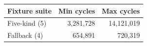 \begin{tabular}{lrr}
\toprule
Fixture suite & Min cycles & Max cycles \\
\midrule
Five-kind (5) & 3,281,728 & 14,121,019 \\
Fallback (4) & 654,891 & 720,319 \\
\bottomrule
\end{tabular}
